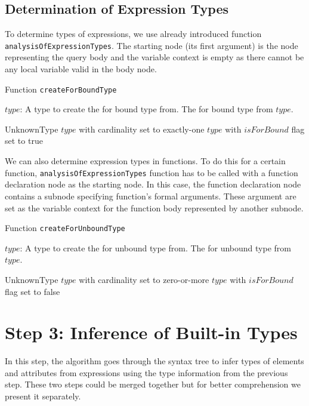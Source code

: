 \subsection{Determination of Expression Types}
To determine types of expressions, we use already introduced function \\ \texttt{analysisOfExpressionTypes}. The starting node (its first argument) is the node representing the query body and the variable context is empty as there cannot be any local variable valid in the body node.

\begin{algorithm}
\caption{Function \texttt{createForBoundType}}
\label{ALG_function_create_for_bound_type}
\begin{algorithmic}[1]
\REQUIRE $type$: A type to create the for bound type from.
\ENSURE The for bound type from $type$.

	\RETURN UnknownType
	\RETURN $type$ with cardinality set to exactly-one
\ELSE
	\STATE {}
	\RETURN $type$ with $isForBound$ flag set to true
\ENDIF
\end{algorithmic}
\end{algorithm}

We can also determine expression types in functions. To do this for a certain function, \texttt{analysisOfExpressionTypes} function has to be called with a function declaration node as the starting node. In this case, the function declaration node contains a subnode specifying function's formal arguments. These argument are set as the variable context for the function body represented by another subnode.

\begin{algorithm}
\caption{Function \texttt{createForUnboundType}}
\label{ALG_function_create_for_unbound_type}
\begin{algorithmic}[1]
\REQUIRE $type$: A type to create the for unbound type from.
\ENSURE The for unbound type from $type$.

	\RETURN UnknownType
	\RETURN $type$ with cardinality set to zero-or-more
\ELSE
	\STATE {}
	\RETURN $type$ with $isForBound$ flag set to false
\ENDIF
\end{algorithmic}
\end{algorithm}

\section{Step 3: Inference of Built-in Types}
In this step, the algorithm goes through the syntax tree to infer types of elements and attributes from expressions using the type information from the previous step. These two steps could be merged together but for better comprehension we present it separately.

